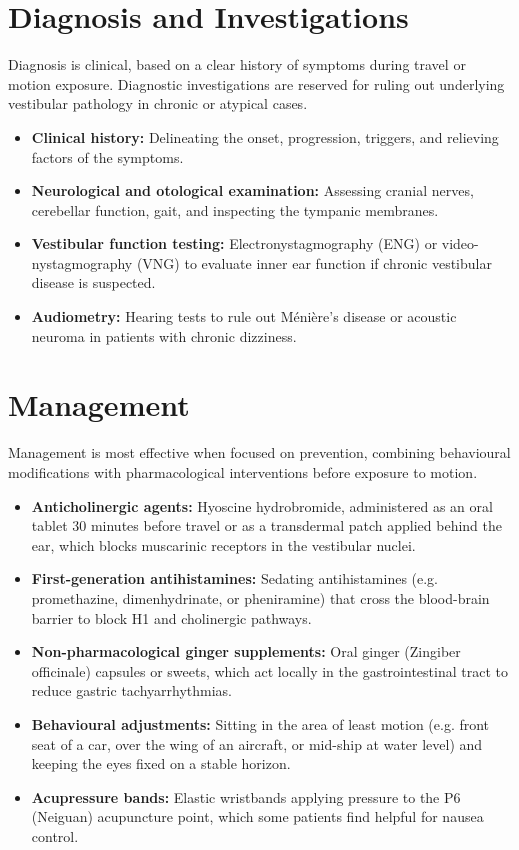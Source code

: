 \section*{Diagnosis and Investigations}
Diagnosis is clinical, based on a clear history of symptoms during travel or motion exposure. Diagnostic investigations are reserved for ruling out underlying vestibular pathology in chronic or atypical cases.
\begin{itemize}
    \item \textbf{Clinical history:} Delineating the onset, progression, triggers, and relieving factors of the symptoms.
    \item \textbf{Neurological and otological examination:} Assessing cranial nerves, cerebellar function, gait, and inspecting the tympanic membranes.
    \item \textbf{Vestibular function testing:} Electronystagmography (ENG) or video-nystagmography (VNG) to evaluate inner ear function if chronic vestibular disease is suspected.
    \item \textbf{Audiometry:} Hearing tests to rule out Ménière's disease or acoustic neuroma in patients with chronic dizziness.
\end{itemize}

\section*{Management}
Management is most effective when focused on prevention, combining behavioural modifications with pharmacological interventions before exposure to motion.
\begin{itemize}
    \item \textbf{Anticholinergic agents:} Hyoscine hydrobromide, administered as an oral tablet 30 minutes before travel or as a transdermal patch applied behind the ear, which blocks muscarinic receptors in the vestibular nuclei.
    \item \textbf{First-generation antihistamines:} Sedating antihistamines (e.g. promethazine, dimenhydrinate, or pheniramine) that cross the blood-brain barrier to block H1 and cholinergic pathways.
    \item \textbf{Non-pharmacological ginger supplements:} Oral ginger (Zingiber officinale) capsules or sweets, which act locally in the gastrointestinal tract to reduce gastric tachyarrhythmias.
    \item \textbf{Behavioural adjustments:} Sitting in the area of least motion (e.g. front seat of a car, over the wing of an aircraft, or mid-ship at water level) and keeping the eyes fixed on a stable horizon.
    \item \textbf{Acupressure bands:} Elastic wristbands applying pressure to the P6 (Neiguan) acupuncture point, which some patients find helpful for nausea control.
\end{itemize}

